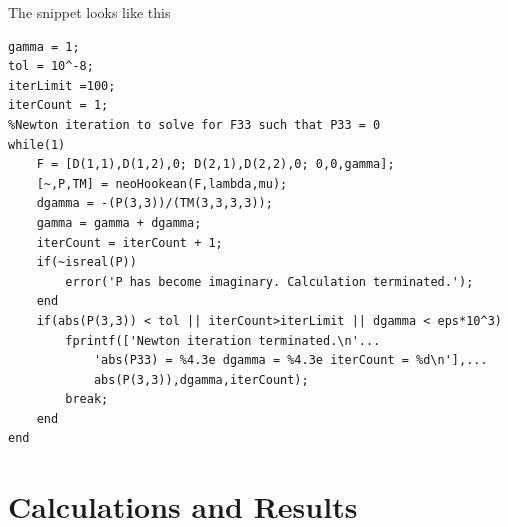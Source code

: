\documentclass[../main.tex]{subfiles}
\begin{document}
The snippet looks like this
\begin{lstlisting}[style=Matlab-editor]
%Initial guess for F33 i.e. gamma and initialize P
gamma = 1;
tol = 10^-8;
iterLimit =100;
iterCount = 1;
%Newton iteration to solve for F33 such that P33 = 0
while(1)
    F = [D(1,1),D(1,2),0; D(2,1),D(2,2),0; 0,0,gamma];
    [~,P,TM] = neoHookean(F,lambda,mu);
    dgamma = -(P(3,3))/(TM(3,3,3,3));
    gamma = gamma + dgamma;
    iterCount = iterCount + 1;
    if(~isreal(P))
        error('P has become imaginary. Calculation terminated.');
    end
    if(abs(P(3,3)) < tol || iterCount>iterLimit || dgamma < eps*10^3)
        fprintf(['Newton iteration terminated.\n'...
            'abs(P33) = %4.3e dgamma = %4.3e iterCount = %d\n'],...
            abs(P(3,3)),dgamma,iterCount);
        break;
    end
end
\end{lstlisting}

\section{Calculations and Results}
\label{sec:calc}
\lstset{
basicstyle=\ttfamily,
columns=fixed
}
\end{document}
